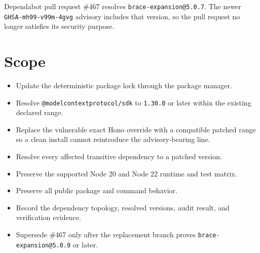 Dependabot pull request \#467 resolves \texttt{b\allowbreak{}r\allowbreak{}a\allowbreak{}c\allowbreak{}e\allowbreak{}-\allowbreak{}e\allowbreak{}x\allowbreak{}p\allowbreak{}a\allowbreak{}n\allowbreak{}s\allowbreak{}i\allowbreak{}o\allowbreak{}n\allowbreak{}@\allowbreak{}5\allowbreak{}.\allowbreak{}0\allowbreak{}.\allowbreak{}7}. The newer \texttt{G\allowbreak{}H\allowbreak{}S\allowbreak{}A\allowbreak{}-\allowbreak{}m\allowbreak{}h\allowbreak{}9\allowbreak{}9\allowbreak{}-\allowbreak{}v\allowbreak{}9\allowbreak{}9\allowbreak{}m\allowbreak{}-\allowbreak{}4\allowbreak{}g\allowbreak{}v\allowbreak{}g} advisory includes that version, so the pull request no longer satisfies its security purpose.

\section{Scope}\label{record-248-scope}

\begin{itemize}
\tightlist
\item
  Update the deterministic package lock through the package manager.
\item
  Resolve \texttt{@\allowbreak{}m\allowbreak{}o\allowbreak{}d\allowbreak{}e\allowbreak{}l\allowbreak{}c\allowbreak{}o\allowbreak{}n\allowbreak{}t\allowbreak{}e\allowbreak{}x\allowbreak{}t\allowbreak{}p\allowbreak{}r\allowbreak{}o\allowbreak{}t\allowbreak{}o\allowbreak{}c\allowbreak{}o\allowbreak{}l\allowbreak{}/\allowbreak{}s\allowbreak{}d\allowbreak{}k} to \texttt{1\allowbreak{}.\allowbreak{}3\allowbreak{}0\allowbreak{}.\allowbreak{}0} or later within the existing declared range.
\item
  Replace the vulnerable exact Hono override with a compatible patched range so a clean install cannot reintroduce the advisory-bearing line.
\item
  Resolve every affected transitive dependency to a patched version.
\item
  Preserve the supported Node 20 and Node 22 runtime and test matrix.
\item
  Preserve all public package and command behavior.
\item
  Record the dependency topology, resolved versions, audit result, and verification evidence.
\item
  Supersede \#467 only after the replacement branch proves \texttt{b\allowbreak{}r\allowbreak{}a\allowbreak{}c\allowbreak{}e\allowbreak{}-\allowbreak{}e\allowbreak{}x\allowbreak{}p\allowbreak{}a\allowbreak{}n\allowbreak{}s\allowbreak{}i\allowbreak{}o\allowbreak{}n\allowbreak{}@\allowbreak{}5\allowbreak{}.\allowbreak{}0\allowbreak{}.\allowbreak{}9} or later.
\end{itemize}

